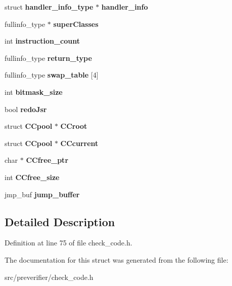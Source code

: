 \begin{DoxyCompactItemize}
\item 
struct {\bf handler\_\-info\_\-type} $\ast$ {\bfseries handler\_\-info}\label{structcontext__type_a7f514de7964661d92644d9ea415e0634}

\item 
fullinfo\_\-type $\ast$ {\bfseries superClasses}\label{structcontext__type_a4825ed764c9ff0295d0451b78a19817d}

\item 
int {\bfseries instruction\_\-count}\label{structcontext__type_a36c54bbd4178b26e94a2d18f2e047e4b}

\item 
fullinfo\_\-type {\bfseries return\_\-type}\label{structcontext__type_acdf9ccb32561cc3b6c8d94b628dc5d4f}

\item 
fullinfo\_\-type {\bfseries swap\_\-table} [4]\label{structcontext__type_a374b556618ae7594c01b3578932c147b}

\item 
int {\bfseries bitmask\_\-size}\label{structcontext__type_a5577baf496dc7e26f27f0f46462cfe51}

\item 
bool {\bfseries redoJsr}\label{structcontext__type_acf0d4395196953585e7a3549cb251a1b}

\item 
struct {\bf CCpool} $\ast$ {\bfseries CCroot}\label{structcontext__type_a2cf5d213b63752a4db3b8fe132c4d5f8}

\item 
struct {\bf CCpool} $\ast$ {\bfseries CCcurrent}\label{structcontext__type_a906575e01c7e29479a338ad5241bf398}

\item 
char $\ast$ {\bfseries CCfree\_\-ptr}\label{structcontext__type_aa8f21ba458d757cf1c542c9b98e481f0}

\item 
int {\bfseries CCfree\_\-size}\label{structcontext__type_a9f13b4aa4023976cd5b765461245d89b}

\item 
jmp\_\-buf {\bfseries jump\_\-buffer}\label{structcontext__type_af2a956e78409d2a3bcff688087187104}

\end{DoxyCompactItemize}


\subsection{Detailed Description}


Definition at line 75 of file check\_\-code.h.



The documentation for this struct was generated from the following file:\begin{DoxyCompactItemize}
\item 
src/preverifier/check\_\-code.h\end{DoxyCompactItemize}
